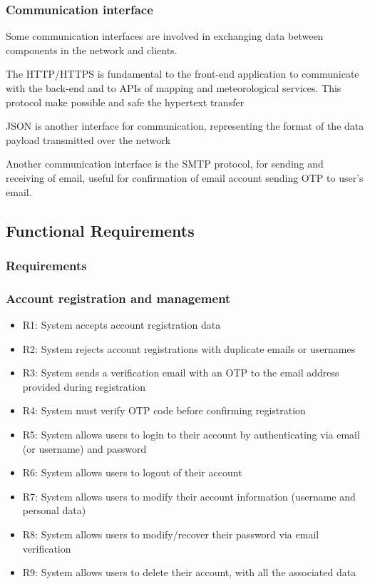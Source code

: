 \subsubsection{Communication interface}

Some communication interfaces are involved in exchanging data between components in the network and clients.

The HTTP/HTTPS is fundamental to the front-end application to communicate with the back-end and to APIs of mapping and meteorological services. This protocol make possible and safe the hypertext transfer

JSON is another interface for communication, representing the format of the data payload transmitted over the network

Another communication interface is the SMTP protocol, for sending and receiving of email, useful for confirmation of email account sending OTP to user’s email.

\subsection{Functional Requirements}

\subsubsection{Requirements}

\subsubsection*{Account registration and management}
\begin{itemize} 
   \item R1: System accepts account registration data
   \item R2: System rejects account registrations with duplicate emails or usernames
   \item R3: System sends a verification email with an OTP to the email address provided during registration
   \item R4: System must verify OTP code before confirming registration
   \item R5: System allows users to login to their account by authenticating via email (or username) and password
   \item R6: System allows users to logout of their account
   \item R7: System allows users to modify their account information (username and personal data)
   \item R8: System allows users to modify/recover their password via email verification
   \item R9: System allows users to delete their account, with all the associated data
\end{itemize}

